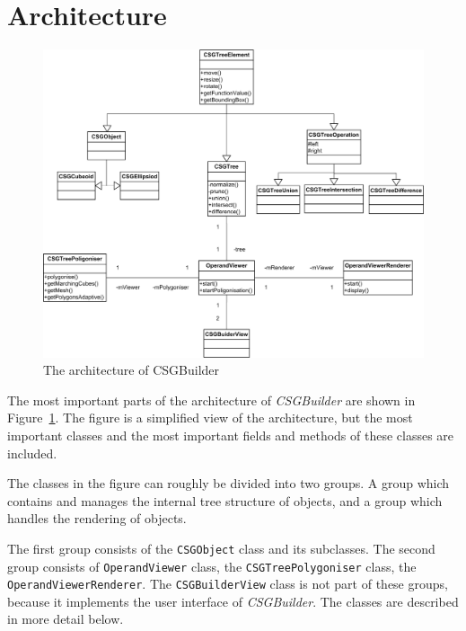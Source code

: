 \documentclass[a4wide,10pt,twocolumn]{article}
\begin{document}
\section{Architecture}
\begin{figure}[!t]
    \includegraphics[width=\textwidth]{./images/architecture}
    \caption{The architecture of CSGBuilder}
    \label{figure:architecture}
\end{figure}

The most important parts of the architecture of \emph{CSGBuilder} are shown in Figure~\ref{figure:architecture}. The figure is a simplified view of the architecture, but the most important classes and the most important fields and methods of these classes are included.

The classes in the figure can roughly be divided into two groups. A group which contains and manages the internal tree structure of objects, and a group which handles the rendering of objects.

The first group consists of the \texttt{CSGObject} class and its subclasses. The second group consists of \texttt{OperandViewer} class, the \texttt{CSGTreePolygoniser} class, the \texttt{OperandViewerRenderer}. The \texttt{CSGBuilderView} class is not part of these groups, because it implements the user interface of \emph{CSGBuilder}. The classes are described in more detail below.
\end{document}
